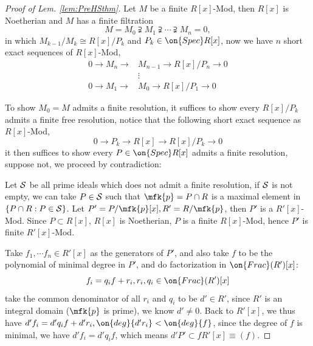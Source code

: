 \begin{proof}[Proof of Lem. \ref{lem:PreHSthm}]
	Let $M$ be a finite $R[x]$-Mod, then $R[x]$ is Noetherian and $M$ has a finite filtration
	$$
	M=M_0\supsetneqq M_1\supsetneqq\cdots\supsetneqq M_n=0,
	$$
	in which $M_{k-1}/M_k\cong R[x]/P_k$ and $P_k\in\on{Spec}R[x]$, now we have $n$ short exact sequences of $R[x]$-Mod,
	\begin{equation*}
		\begin{split}
			0\rightarrow M_n\rightarrow &M_{n-1}\rightarrow R[x]/P_n\rightarrow 0\\
			&\vdots\\
			0\rightarrow M_1\rightarrow &M_{0}\rightarrow R[x]/P_1\rightarrow 0
		\end{split}
	\end{equation*}
	
	To show $M_0=M$ admits a finite resolution, it suffices to show every $R[x]/P_k$ admits a finite free resolution, notice that the following short exact sequence as $R[x]$-Mod,
	$$
	0\rightarrow P_k\rightarrow R[x]\rightarrow R[x]/P_k\rightarrow0
	$$
	it then suffices to show every $P\in\on{Spec}R[x]$ admits a finite resolution, suppose not, we proceed by contradiction:
	
	Let $\mathcal{S}$ be all prime ideals which does not admit a finite resolution, if $\mathcal{S}$ is not empty, we can take $P\in\mathcal{S}$ such that $\mfk{p}=P\cap R$ is a maximal element in $\{P\cap R:P\in\mathcal{S}\}$. Let $P'=P/\mfk{p}[x], R'=R/\mfk{p}$, then $P'$ is a $R'[x]$-Mod. Since $P\subset R[x]$, $R[x]$ is Noetherian, $P$ is a finite $R[x]$-Mod, hence $P'$ is finite $R'[x]$-Mod.
	
	Take $f_1,\cdots f_n\in R'[x]$ as the generators of $P'$, and also take $f$ to be the polynomial of minimal degree in $P'$, and do factorization in $\on{Frac}(R')[x]$:
	$$
	f_i=q_if+r_i, r_i,q_i\in \on{Frac}(R')[x]
	$$
	take the common denominator of all $r_i$ and $q_i$ to be $d'\in R'$, since $R'$ is an integral domain ($\mfk{p}$ is prime), we know $d'\neq 0$. Back to $R'[x]$, we thus have $d'f_i=d'q_if+d'r_i, \on{deg}{d'r_i}<\on{deg}{f}$, since the degree of $f$ is minimal, we have $d'f_i=d'q_if$, which means $d'P'\subset fR'[x]\equiv (f)$.
	

\end{proof}
